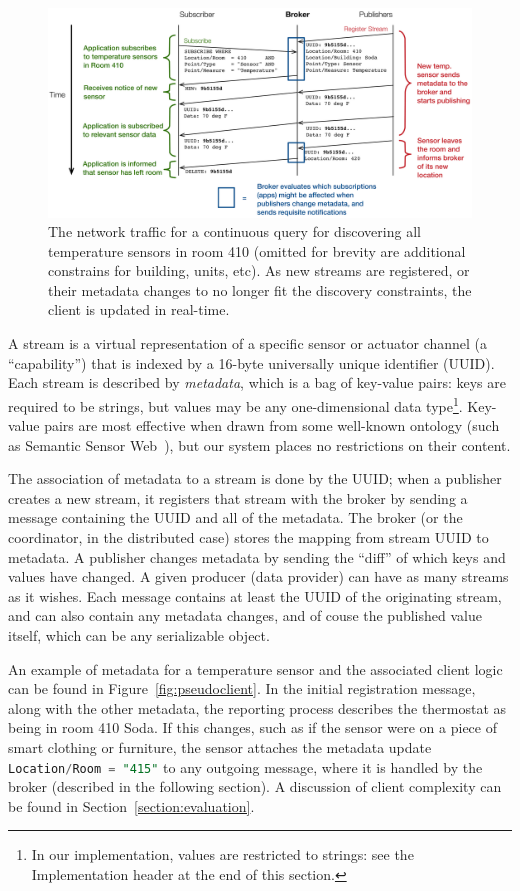 \begin{figure}[!ht]
\centering
\includegraphics[width=.8\linewidth]{figs/messages.pdf}
\caption{The network traffic for a continuous query for discovering all temperature sensors in room 410 (omitted
for brevity are additional constrains for building, units, etc). As new streams are registered, or their metadata
changes to no longer fit the discovery constraints, the client is updated in real-time.}
\label{fig:messages}
\end{figure}


A stream is a virtual representation of a specific sensor or actuator channel (a ``capability'') that is indexed by a 16-byte universally unique identifier (UUID).
Each stream is described by \emph{metadata}, which is a bag of key-value pairs: keys are required to be strings, but values may be any one-dimensional data type\footnote{In our implementation, values are restricted to strings: see the Implementation header at the end of this section.}.
Key-value pairs are most effective when drawn from some well-known ontology (such as Semantic Sensor Web~\cite{sheth2008semantic}), but our system places no restrictions on their content.

The association of metadata to a stream is done by the UUID; when a publisher creates a new stream, it registers that stream with the broker by sending a message containing the UUID and all of the metadata.
The broker (or the coordinator, in the distributed case) stores the mapping from stream UUID to metadata.
A publisher changes metadata by sending the ``diff'' of which keys and values have changed.
A given producer (data provider) can have as many streams as it wishes.
Each message contains at least the UUID of the originating stream, and can also contain any metadata changes, and of couse the published value itself, which can be any serializable object.

An example of metadata for a temperature sensor and the associated client logic can be found in Figure~\ref{fig:pseudoclient}.
In the initial registration message, along with the other metadata, the reporting process describes the thermostat as being in room 410 Soda.
If this changes, such as if the sensor were on a piece of smart clothing or furniture, the sensor attaches the metadata update \lstinline[language=SQL,basicstyle=\ttfamily]{Location/Room = "415"} to any outgoing message, where it is handled by the broker (described in the following section).
A discussion of client complexity can be found in Section~\ref{section:evaluation}.

